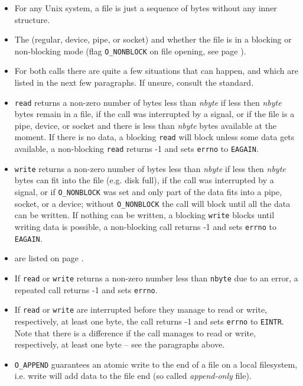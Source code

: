 \begin{itemize}
\setlength{\itemsep}{0.8\itemsep}
\item For any Unix system, a file is just a sequence of bytes without any inner
structure.
\item The  (regular, device, pipe, or socket) and whether the file is in a
blocking or non-blocking mode (flag \texttt{O\_NONBLOCK} on file opening, see
page \pageref{O_NONBLOCK}).
\item For both calls there are quite a few situations that can happen, and
which are listed in the next few paragraphs.  If unsure, consult the standard.
\item \texttt{read} returns a non-zero number of bytes less than \emph{nbyte} if
less then \emph{nbyte} bytes remain in a file, if the call was interrupted
by a signal, or if the file is a pipe, device, or socket and there is less than
\emph{nbyte} bytes available at the moment.  If there is no data, a blocking
\texttt{read} will block unless some data gets available, a non-blocking
\texttt{read} returns -1 and sets \texttt{errno} to \texttt{EAGAIN}.
\item \texttt{write} returns a non-zero number of bytes less than \emph{nbyte}
if less then \emph{nbyte} bytes can fit into the file (e.g. disk full), if the call
was interrupted by a signal, or if \verb#O_NONBLOCK# was set and only part of
the data fits into a pipe, socket, or a device; without \verb#O_NONBLOCK#
the call will block until all the data can be written.  If nothing can be
written, a blocking \texttt{write} blocks until writing data is possible, a
non-blocking call returns -1 and sets \texttt{errno} to \texttt{EAGAIN}.
\item {} are listed on page
\pageref{NAMEDPIPE}.
\item
If \texttt{read} or \texttt{write} returns a non-zero number less than
\texttt{nbyte} due to an error, a repeated call returns -1 and sets
\texttt{errno}.
\item If \texttt{read} or \texttt{write} are interrupted before they manage to
read or write, respectively, at least one byte, the call returns -1 and sets
\texttt{errno} to \texttt{EINTR}.  Note that there is a difference if the call
manages to read or write, respectively, at least one byte -- see the paragraphs
above.
\item \texttt{O\_APPEND} guarantees an atomic write to the end of a file on a
local filesystem, i.e.  write will add data to the file end (so
called \emph{append-only} file).
\end{itemize}

